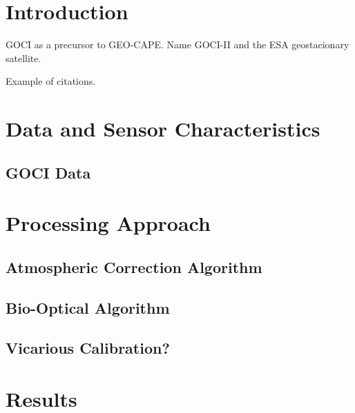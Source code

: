 \documentclass[12pt]{spieman}  %
\begin{document}
\begin{spacing}{2}   %

\section{Introduction}
GOCI as a precursor to GEO-CAPE. 
Name GOCI-II and the ESA geostacionary satellite.

Example of citations\cite{ConchaThesis2015,Franz:2015}.


\section{Data and Sensor Characteristics}
\subsection{GOCI Data}
\section{Processing Approach}
\subsection{Atmospheric Correction Algorithm}

\subsection{Bio-Optical Algorithm}
\subsection{Vicarious Calibration?}

\section{Results}
\label{sec:Results}

\end{spacing}
\end{document}
